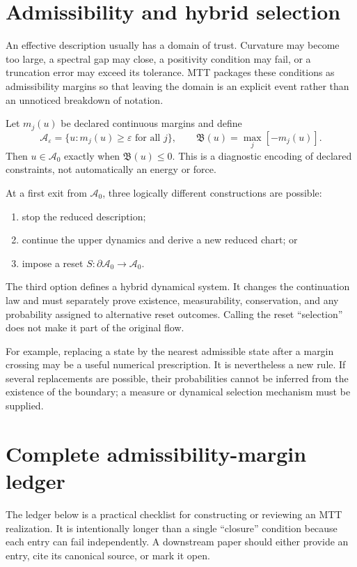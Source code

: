 \documentclass[11pt]{article}
\begin{document}
\section{Admissibility and hybrid selection}

An effective description usually has a domain of trust. Curvature may become
too large, a spectral gap may close, a positivity condition may fail, or a
truncation error may exceed its tolerance. MTT packages these conditions as
admissibility margins so that leaving the domain is an explicit event rather
than an unnoticed breakdown of notation.

Let $m_j(u)$ be declared continuous margins and define
\[
 \mathcal A_\varepsilon
 =\{u:m_j(u)\ge\varepsilon\text{ for all }j\},
 \qquad
 \mathfrak B(u)=\max_j[-m_j(u)].
\]
Then $u\in\mathcal A_0$ exactly when $\mathfrak B(u)\le0$. This is a diagnostic
encoding of declared constraints, not automatically an energy or force.

At a first exit from $\mathcal A_0$, three logically different constructions
are possible:
\begin{enumerate}
\item stop the reduced description;
\item continue the upper dynamics and derive a new reduced chart; or
\item impose a reset $S:\partial\mathcal A_0\to\mathcal A_0$.
\end{enumerate}
The third option defines a hybrid dynamical system. It changes the continuation
law and must separately prove existence, measurability, conservation, and any
probability assigned to alternative reset outcomes. Calling the reset
``selection'' does not make it part of the original flow.

For example, replacing a state by the nearest admissible state after a margin
crossing may be a useful numerical prescription. It is nevertheless a new
rule. If several replacements are possible, their probabilities cannot be
inferred from the existence of the boundary; a measure or dynamical selection
mechanism must be supplied.

\section{Complete admissibility-margin ledger}

The ledger below is a practical checklist for constructing or reviewing an
MTT realization. It is intentionally longer than a single ``closure''
condition because each entry can fail independently. A downstream paper
should either provide an entry, cite its canonical source, or mark it open.
\end{document}
